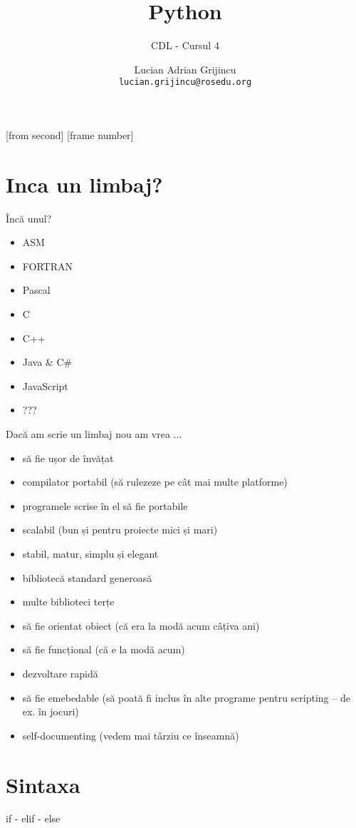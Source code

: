 \documentclass{beamer}
\title[Python]{Python}
\subtitle{CDL - Cursul 4}
\institute{ROSEdu}
\author{Lucian Adrian Grijincu \\ 
  \texttt{lucian.grijincu@rosedu.org}}
\begin{document}
[from second]
[frame number]

\frame{\titlepage}

\frame{\tableofcontents}

\section{Inca un limbaj?}

\frame{\tableofcontents[currentsection]}


\begin{frame}{Încă unul?}
  \begin{itemize}
  \item ASM
  \item FORTRAN %
  \item Pascal
  \item C
  \item C++
  \item Java \& C\#
  \item JavaScript
  \item ???
  \end{itemize}
\end{frame}


\begin{frame}{Dacă am scrie un limbaj nou am vrea ...}
  \begin{itemize}[<+->]
  \item să fie ușor de învățat
  \item compilator portabil (să rulezeze pe cât mai multe platforme)
  \item programele scrise în el să fie portabile
  \item scalabil (bun și pentru proiecte mici și mari)
  \item stabil, matur, simplu și elegant
  \item bibliotecă standard generoasă
  \item multe biblioteci terțe
  \item să fie orientat obiect (că era la modă acum câțiva ani)
  \item să fie funcțional (că e la modă acum)
  \item dezvoltare rapidă
  \item să fie emebedable (să poată fi inclus în alte programe
    pentru scripting – de ex. în jocuri)
  \item self-documenting (vedem mai târziu ce înseamnă)
  \end{itemize}
\end{frame}


\section{Sintaxa}
\frame{\tableofcontents[currentsection]}

\begin{frame}{if - elif - else}
    
\end{frame}
\end{document}
